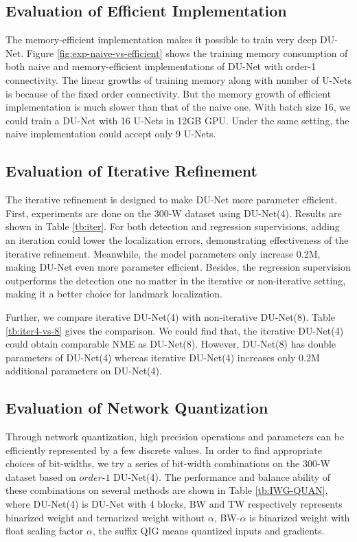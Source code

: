 \documentclass[runningheads]{llncs}
\begin{document}
\subsection{Evaluation of Efficient Implementation}

The memory-efficient implementation makes it possible to train very deep DU-Net. Figure \ref{fig:exp-naive-vs-efficient} shows the training memory consumption of both naive and memory-efficient implementations of DU-Net with order-1 connectivity. The linear growths of training memory along with number of U-Nets is because of the fixed order connectivity. But the memory growth of efficient implementation is much slower than that of the naive one. With batch size 16, we could train a DU-Net with 16 U-Nets in 12GB GPU. Under the same setting, the naive implementation could accept only 9 U-Nets.


\subsection{Evaluation of Iterative Refinement}
The iterative refinement is designed to make DU-Net more parameter efficient. First, experiments are done on the 300-W dataset using DU-Net(4). Results are shown in Table \ref{tb:iter}. For both detection and regression supervisions, adding an iteration could lower the localization errors, demonstrating effectiveness of the iterative refinement. Meanwhile, the model parameters only increase 0.2M, making DU-Net even more parameter efficient. Besides, the regression supervision outperforms the detection one no matter in the iterative or non-iterative setting, making it a better choice for landmark localization. 


Further, we compare iterative DU-Net(4) with non-iterative DU-Net(8). Table \ref{tb:iter4-vs-8} gives the comparison. We could find that, the iterative DU-Net(4) could obtain comparable NME as DU-Net(8). However, DU-Net(8) has double parameters of  DU-Net(4) whereas iterative DU-Net(4) increases only 0.2M additional parameters on DU-Net(4).


\subsection{Evaluation of Network Quantization}

Through network quantization, high precision operations and parameters can be efficiently represented by a few discrete values. 
In order to find appropriate choices of bit-widths, we try a series of bit-width combinations on the 300-W dataset based on $order$-$1$ DU-Net(4). The performance and balance ability of these combinations on several methods are shown in Table \ref{tb:IWG-QUAN}, where DU-Net(4) is DU-Net with 4 blocks, BW and TW respectively represents binarized weight and ternarized weight without $\alpha$, BW-$\alpha$ is binarized weight with float scaling factor $\alpha$, the suffix QIG means quantized inputs and gradients. 
\end{document}
